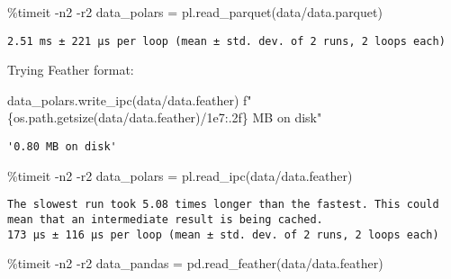 \documentclass[
  letterpaper,
  DIV=11,
  numbers=noendperiod]{scrartcl}
\newenvironment{Shaded}{\begin{snugshade}}{\end{snugshade}}
\newcommand{\FloatTok}[1]{\textcolor[rgb]{0.68,0.00,0.00}{#1}}
\newcommand{\NormalTok}[1]{\textcolor[rgb]{0.00,0.23,0.31}{#1}}
\newcommand{\OperatorTok}[1]{\textcolor[rgb]{0.37,0.37,0.37}{#1}}
\newcommand{\SpecialCharTok}[1]{\textcolor[rgb]{0.37,0.37,0.37}{#1}}
\newcommand{\SpecialStringTok}[1]{\textcolor[rgb]{0.13,0.47,0.30}{#1}}
\newcommand{\StringTok}[1]{\textcolor[rgb]{0.13,0.47,0.30}{#1}}
\begin{document}
\begin{Shaded}
\begin{Highlighting}[]
\OperatorTok{\%}\NormalTok{timeit }\OperatorTok{{-}}\NormalTok{n2 }\OperatorTok{{-}}\NormalTok{r2 data\_polars }\OperatorTok{=}\NormalTok{ pl.read\_parquet(}\StringTok{\textquotesingle{}data/data.parquet\textquotesingle{}}\NormalTok{)}
\end{Highlighting}
\end{Shaded}

\begin{verbatim}
2.51 ms ± 221 µs per loop (mean ± std. dev. of 2 runs, 2 loops each)
\end{verbatim}

Trying Feather format:

\begin{Shaded}
\begin{Highlighting}[]
\NormalTok{data\_polars.write\_ipc(}\StringTok{\textquotesingle{}data/data.feather\textquotesingle{}}\NormalTok{)}
\SpecialStringTok{f"}\SpecialCharTok{\{}\NormalTok{os}\SpecialCharTok{.}\NormalTok{path}\SpecialCharTok{.}\NormalTok{getsize(}\StringTok{\textquotesingle{}data/data.feather\textquotesingle{}}\NormalTok{)}\OperatorTok{/}\FloatTok{1e7}\SpecialCharTok{:.2f\}}\SpecialStringTok{ MB on disk"}
\end{Highlighting}
\end{Shaded}

\begin{verbatim}
'0.80 MB on disk'
\end{verbatim}

\begin{Shaded}
\begin{Highlighting}[]
\OperatorTok{\%}\NormalTok{timeit }\OperatorTok{{-}}\NormalTok{n2 }\OperatorTok{{-}}\NormalTok{r2 data\_polars }\OperatorTok{=}\NormalTok{ pl.read\_ipc(}\StringTok{\textquotesingle{}data/data.feather\textquotesingle{}}\NormalTok{)}
\end{Highlighting}
\end{Shaded}

\begin{verbatim}
The slowest run took 5.08 times longer than the fastest. This could mean that an intermediate result is being cached.
173 µs ± 116 µs per loop (mean ± std. dev. of 2 runs, 2 loops each)
\end{verbatim}

\begin{Shaded}
\begin{Highlighting}[]
\OperatorTok{\%}\NormalTok{timeit }\OperatorTok{{-}}\NormalTok{n2 }\OperatorTok{{-}}\NormalTok{r2 data\_pandas }\OperatorTok{=}\NormalTok{ pd.read\_feather(}\StringTok{\textquotesingle{}data/data.feather\textquotesingle{}}\NormalTok{)}
\end{Highlighting}
\end{Shaded}
\end{document}
